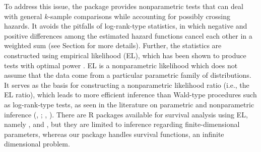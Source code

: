 To address this issue, %
the package  \cite[][]{survELtest:2020} provides nonparametric tests that can deal with general $k$-sample comparisons while accounting for possibly crossing hazards. It avoids the pitfalls of log-rank-type statistics, in which negative and positive differences among the estimated hazard functions cancel each other in a weighted sum (see Section  for more details). Further, the statistics are constructed using empirical likelihood (EL),
which has been shown to produce tests with optimal power \citep[see, e.g.,][]{K:2012}. %
EL is a nonparametric likelihood which does not assume that the data come from %
a particular parametric family of distributions. It serves as the basis for constructing a nonparametric likelihood ratio (i.e., the EL ratio), which leads to more efficient inference than
Wald-type procedures such as log-rank-type tests, %
as seen in the literature on parametric \citep[see, e.g.,][]{M:1994} and nonparametric inference (\citeauthor{B:2003}, \citeyear{B:2003}; \citeauthor{K:2012}, \citeyear{K:2012}).
There are R packages available for survival analysis using EL, namely  \cite[][]{emplik:2018},  \cite[][]{emplik2:2018} and  \cite[][]{ELYP:2018}, but they are limited to inference regarding finite-dimensional parameters, %
whereas our package handles survival functions, an infinite dimensional problem.  

